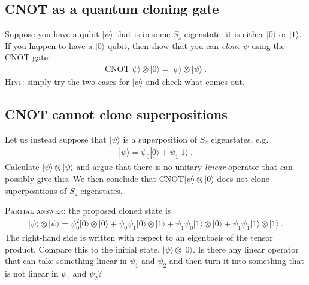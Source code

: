 \documentclass[12pt]{article}
\newcommand\acro[1]{{\small {#1}}}
\numberwithin{equation}{section}    %
\begin{document}
\subsection{CNOT as a quantum cloning gate}

Suppose you have a qubit $|\psi\rangle$ that is in some $S_z$ eigenstate: it is either $|0\rangle$ or $|1\rangle$. If you happen to have a $|0\rangle$ qubit, then show that you can \emph{clone} $\psi$ using the \acro{CNOT} gate:
\begin{align}
	\text{CNOT}|\psi\rangle\otimes |0\rangle = |\psi\rangle\otimes|\psi\rangle \ .
\end{align}
\textsc{Hint:} simply try the two cases for $|\psi\rangle$ and check what comes out.

\subsection{CNOT cannot clone superpositions}

Let us instead suppose that $|\psi\rangle$ is a superposition of $S_z$ eigenstates, e.g. 
\begin{align}
	|\psi\rangle = \psi_0|0\rangle + \psi_1|1\rangle \ .
\end{align}
Calculate $|\psi\rangle\otimes |\psi\rangle$ and argue that there is no unitary \emph{linear} operator that can possibly give this. We then conclude that $\text{CNOT}|\psi\rangle\otimes |0\rangle$ does not clone superpositions of $S_z$ eigenstates.

\textsc{Partial answer}: the proposed cloned state is
\begin{align}
 	|\psi\rangle\otimes |\psi\rangle = 
 	\psi_0^2  |0\rangle\otimes|0\rangle
	+ \psi_0 \psi_1 |0\rangle\otimes|1\rangle
	+ \psi_1 \psi_0  |1\rangle\otimes|0\rangle
	+ \psi_1 \psi_1  |1\rangle\otimes|1\rangle  \ .
 \end{align}
 The right-hand side is written with respect to an eigenbasis of the tensor product. Compare this to the initial state, $|\psi\rangle\otimes|0\rangle$. Is there any linear operator that can take something linear in $\psi_1$ and $\psi_2$ and then turn it into something that is not linear in $\psi_1$ and $\psi_2$?
\end{document}
